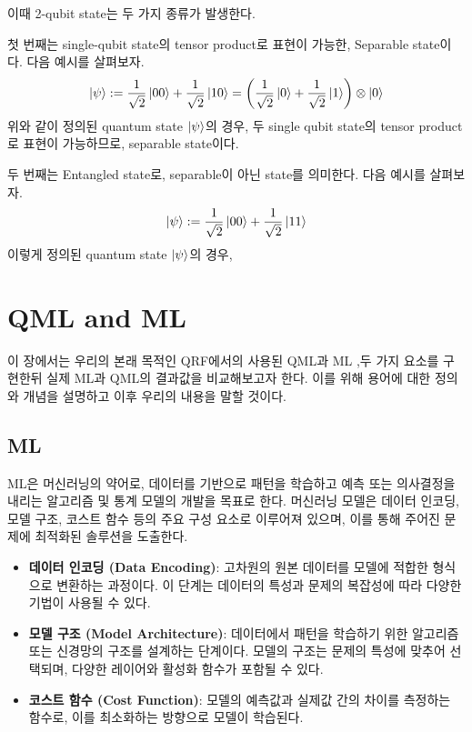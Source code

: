 이때 2-qubit state는 두 가지 종류가 발생한다.

첫 번째는 single-qubit state의 tensor product로 표현이 가능한, Separable state이다. 다음 예시를 살펴보자.
\[
    \ket \psi := {1 \over \sqrt{2}}\ket{00} + {1 \over \sqrt{2}}\ket{10} = \left({1 \over \sqrt{2}}\ket{0} + {1 \over \sqrt{2}}\ket{1}\right) \otimes \ket{0}
\]
위와 같이 정의된 quantum state \(\ket \psi\)의 경우, 두 single qubit state의 tensor product로 표현이 가능하므로, separable state이다.

두 번째는 Entangled state로, separable이 아닌 state를 의미한다. 다음 예시를 살펴보자.
\[
    \ket \psi := {1 \over \sqrt{2}}\ket{00} + {1 \over \sqrt{2}}\ket{11}
\]
이렇게 정의된 quantum state \( \ket{\psi} \)의 경우,


\section{QML and ML}
 이 장에서는 우리의 본래 목적인 QRF에서의 사용된 QML과 ML ,두 가지 요소를 구현한뒤 실제 ML과 QML의 결과값을 비교해보고자 한다. 이를 위해 용어에 대한 정의와 개념을 설명하고 이후 우리의 내용을 말할 것이다.

 \subsection{ML}
ML은 머신러닝의 약어로, 데이터를 기반으로 패턴을 학습하고 예측 또는 의사결정을 내리는 알고리즘 및 통계 모델의 개발을 목표로 한다. 머신러닝 모델은 데이터 인코딩, 모델 구조, 코스트 함수 등의 주요 구성 요소로 이루어져 있으며, 이를 통해 주어진 문제에 최적화된 솔루션을 도출한다.

\begin{itemize}
    \item \textbf{데이터 인코딩 (Data Encoding)}: 고차원의 원본 데이터를 모델에 적합한 형식으로 변환하는 과정이다. 이 단계는 데이터의 특성과 문제의 복잡성에 따라 다양한 기법이 사용될 수 있다.

    \item \textbf{모델 구조 (Model Architecture)}: 데이터에서 패턴을 학습하기 위한 알고리즘 또는 신경망의 구조를 설계하는 단계이다. 모델의 구조는 문제의 특성에 맞추어 선택되며, 다양한 레이어와 활성화 함수가 포함될 수 있다.

    \item \textbf{코스트 함수 (Cost Function)}: 모델의 예측값과 실제값 간의 차이를 측정하는 함수로, 이를 최소화하는 방향으로 모델이 학습된다.
\end{itemize}

